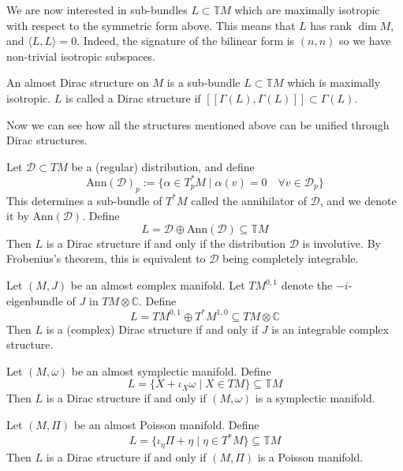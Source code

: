 We are now interested in sub-bundles $L\subset\mathbb{T}M$ which are maximally isotropic with respect to the symmetric form above. This means that $L$ has rank $\dim M$, and $\langle L,L\rangle=0$. Indeed, the signature of the bilinear form is $(n,n)$ so we have non-trivial isotropic subspaces.
\begin{definition}
  An almost Dirac structure on $M$ is a sub-bundle $L\subset\mathbb{T}M$ which is maximally isotropic. $L$ is called a Dirac structure if $[\![\Gamma(L),\Gamma(L)]\!]\subset\Gamma(L)$.
\end{definition}
Now we can see how all the structures mentioned above can be unified through Dirac structures.
\begin{example}[Distributions]
  Let $\mathcal{D}\subset TM$ be a (regular) distribution, and define $$\text{Ann}(\mathcal{D})_p:=\{\alpha\in T_p^*M\mid \alpha(v)=0\quad\forall v\in \mathcal{D}_p\}$$
  This determines a sub-bundle of $T^*M$ called the annihilator of $\mathcal{D}$, and we denote it by $\text{Ann}(\mathcal{D})$. Define
  \begin{equation}
      L=\mathcal{D}\oplus\text{Ann}(\mathcal{D})\subseteq\mathbb{T}M
  \end{equation}
  Then $L$ is a Dirac structure if and only if the distribution $\mathcal{D}$ is involutive. By Frobenius's theorem, this is equivalent to $\mathcal{D}$ being completely integrable.
\end{example}
\begin{example}
    Let $(M, J)$ be an almost complex manifold. Let $TM^{0,1}$ denote the $-i$-eigenbundle of $J$ in $TM\otimes\mathbb{C}$. Define
    \begin{equation}
        L=TM^{0,1}\oplus T^*M^{1,0}\subseteq TM\otimes\mathbb{C}
    \end{equation}
    Then $L$ is a (complex) Dirac structure if and only if $J$ is an integrable complex structure.
\end{example}
\begin{example}
    Let $(M,\omega)$ be an almost symplectic manifold. Define 
    \begin{equation}
        L=\{X+\iota_X\omega\mid X\in TM\}\subseteq \mathbb{T}M
    \end{equation}
    Then $L$ is a Dirac structure if and only if $(M,\omega)$ is a symplectic manifold.
\end{example}
\begin{example}
    Let $(M,\Pi)$ be an almost Poisson manifold. Define
    \begin{equation}
        L=\{\iota_\eta \Pi +\eta\mid\eta\in T^*M\}\subseteq \mathbb{T}M
    \end{equation}
    Then $L$ is a Dirac structure if and only if $(M,\Pi)$ is a Poisson manifold.
\end{example}

